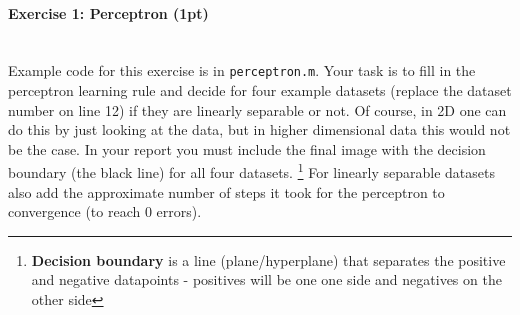 \documentclass[a4paper,11pt]{article}
\newenvironment{exercise}[3]{\paragraph{Exercise #1: #2 (#3pt)}\ \\}{
\medskip}
\begin{document}
\begin{exercise}{1}{Perceptron}{1}
Example code for this exercise is in \texttt{perceptron.m}. Your task is to fill in the perceptron learning rule and decide for four example datasets (replace the dataset number on line 12) if they are linearly separable or not. Of course, in 2D one can do this by just looking at the data, but in higher dimensional data this would not be the case. In your report you must include the final image with the decision boundary (the black line) for all four datasets. \footnote{\textbf{Decision boundary} is a line (plane/hyperplane) that separates the positive and negative datapoints - positives will be one one side and negatives on the other side} For linearly separable datasets also add the approximate number of steps it took for the perceptron to convergence (to reach 0 errors).

\end{exercise}
\end{document}
